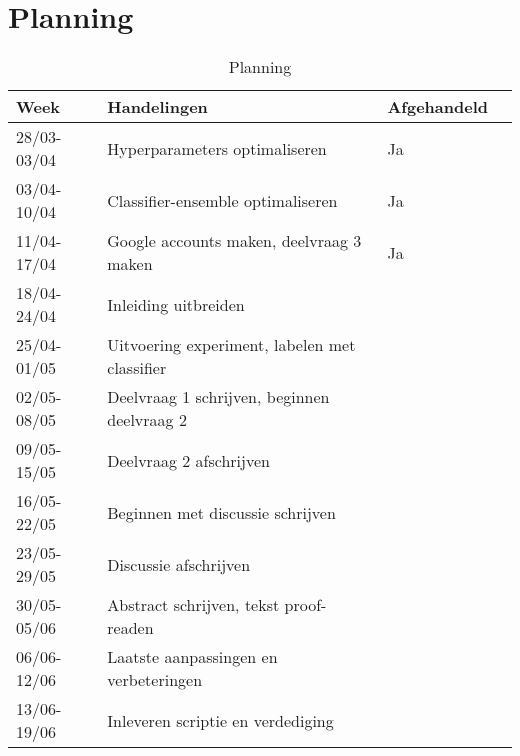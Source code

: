 \documentclass[../main.tex]{subfiles}
\begin{document}
\section{Planning}

\begin{table}[!b]
\centering
\caption{Planning}
\label{tab:planning}
\begin{tabular}{@{}ll@{}ll@{}}
\toprule
Week        & Handelingen                                                     & Afgehandeld \\ \midrule
28/03-03/04 & Hyperparameters optimaliseren                                   &     Ja      \\
03/04-10/04 & Classifier-ensemble optimaliseren                               &     Ja      \\
11/04-17/04 & Google accounts maken, deelvraag 3 maken                        &     Ja      \\
18/04-24/04 & Inleiding uitbreiden                                            &             \\
25/04-01/05 & Uitvoering experiment, labelen met classifier                   &             \\
02/05-08/05 & Deelvraag 1 schrijven, beginnen deelvraag 2                     &             \\
09/05-15/05 & Deelvraag 2 afschrijven                                         &             \\
16/05-22/05 & Beginnen met discussie schrijven                                &             \\
23/05-29/05 & Discussie afschrijven                                           &             \\
30/05-05/06 & Abstract schrijven, tekst proof-readen                          &             \\
06/06-12/06 & Laatste aanpassingen en verbeteringen                           &             \\
13/06-19/06 & Inleveren scriptie en verdediging                               &             \\ \bottomrule
\end{tabular}

\end{table}
\end{document}
